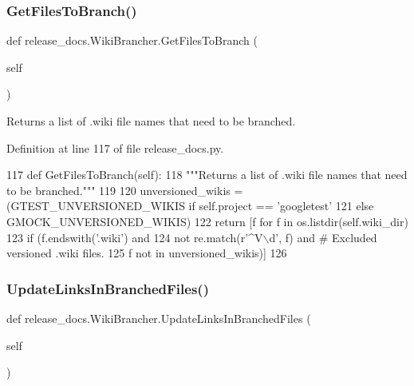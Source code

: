 \subsubsection{\texorpdfstring{Get\+Files\+To\+Branch()}{GetFilesToBranch()}}
{\footnotesize\ttfamily def release\+\_\+docs.\+Wiki\+Brancher.\+Get\+Files\+To\+Branch (\begin{DoxyParamCaption}\item[{}]{self }\end{DoxyParamCaption})}

\begin{DoxyVerb}Returns a list of .wiki file names that need to be branched.\end{DoxyVerb}
 

Definition at line 117 of file release\+\_\+docs.\+py.


\begin{DoxyCode}
117   \textcolor{keyword}{def }GetFilesToBranch(self):
118     \textcolor{stringliteral}{"""Returns a list of .wiki file names that need to be branched."""}
119 
120     unversioned\_wikis = (GTEST\_UNVERSIONED\_WIKIS \textcolor{keywordflow}{if} self.project == \textcolor{stringliteral}{'googletest'}
121                          \textcolor{keywordflow}{else} GMOCK\_UNVERSIONED\_WIKIS)
122     \textcolor{keywordflow}{return} [f \textcolor{keywordflow}{for} f \textcolor{keywordflow}{in} os.listdir(self.wiki\_dir)
123             \textcolor{keywordflow}{if} (f.endswith(\textcolor{stringliteral}{'.wiki'}) \textcolor{keywordflow}{and}
124                 \textcolor{keywordflow}{not} re.match(\textcolor{stringliteral}{r'^V\(\backslash\)d'}, f) \textcolor{keywordflow}{and}  \textcolor{comment}{# Excluded versioned .wiki files.}
125                 f \textcolor{keywordflow}{not} \textcolor{keywordflow}{in} unversioned\_wikis)]
126 
\end{DoxyCode}
\mbox{\label{classrelease__docs_1_1WikiBrancher_aa0bc4b1b78426fe7a8496d570b540f1d}} 
\subsubsection{\texorpdfstring{Update\+Links\+In\+Branched\+Files()}{UpdateLinksInBranchedFiles()}}
{\footnotesize\ttfamily def release\+\_\+docs.\+Wiki\+Brancher.\+Update\+Links\+In\+Branched\+Files (\begin{DoxyParamCaption}\item[{}]{self }\end{DoxyParamCaption})}



